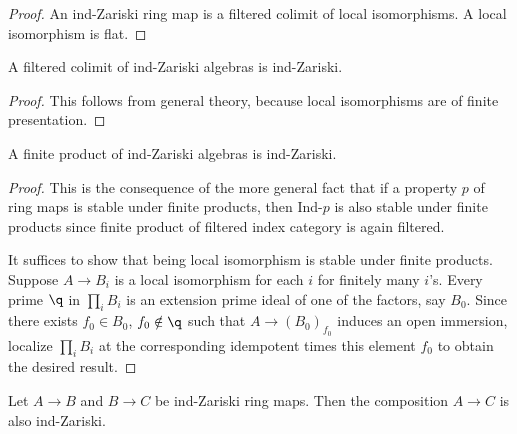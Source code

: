 \begin{proof}
    \leanok
    An ind-Zariski ring map is a filtered colimit of local isomorphisms. A local isomorphism is flat.
\end{proof}

\begin{lemma}
  A filtered colimit of ind-Zariski algebras is ind-Zariski.
  \label{lemma:ind-ind-Zariski}
  \leanok
\end{lemma}

\begin{proof}
    This follows from general theory, because local isomorphisms are of finite presentation.
\end{proof}

\begin{lemma}
  A finite product of ind-Zariski algebras is ind-Zariski.
  \label{lemma:ind-Zariski-products}
  \leanok
\end{lemma}

\begin{proof}
    \leanok
  This is the consequence of the more general fact that if a property $p$ of ring maps is stable
  under finite products, then Ind-$p$ is also stable under finite products since finite product
  of filtered index category is again filtered.

  It suffices to show that being local isomorphism is stable under finite products. Suppose
  $A \to B_i$ is a local isomorphism for each $i$ for finitely many $i$'s. Every prime $\q$ in
  $\prod_i B_i$ is an extension prime ideal of one of the factors, say $B_0$. Since there exists
  $f_0 \in B_0$, $f_0 \notin \q$ such that $A \to (B_0)_{f_0}$ induces an open immersion,
  localize $\prod_i B_i$ at the corresponding idempotent times this element \(f_0\) to obtain
  the desired result.
\end{proof}

\begin{lemma}
  \label{thm:ind-Zariski-composition}
  Let \(A \to B\) and \(B \to C\) be ind-Zariski ring maps. Then the composition \(A \to C\) is also ind-Zariski.
  \leanok
\end{lemma}

